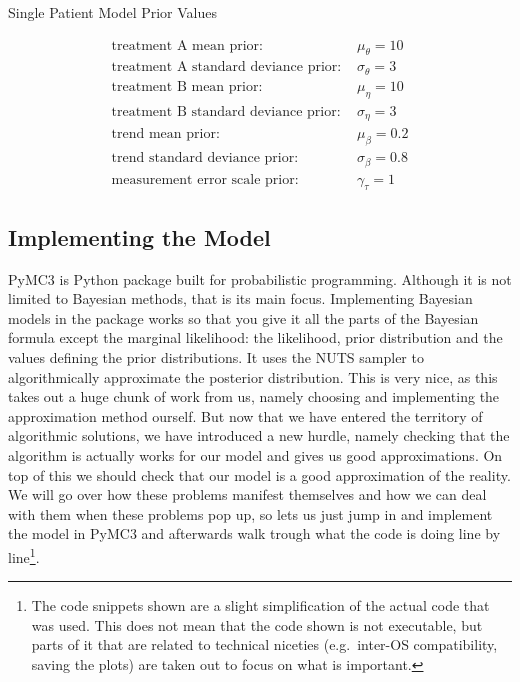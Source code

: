 \documentclass[12pt,a4paper,leqno]{report}
\theoremstyle{plain}
\theoremstyle{definition}
\theoremstyle{remark}
\begin{document}
\begin{table}[H]
    \caption{Single Patient Model Prior Values}\label{singlelpatientmodelpriorvalues}
    \begin{align}\label{}
        \text{treatment A mean prior: } & \mu_{\theta} = 10 \nonumber \\
        \text{treatment A standard deviance prior: } & \sigma_{\theta} = 3 \nonumber \\
        \text{treatment B mean prior: } & \mu_{\eta} = 10 \nonumber \\
        \text{treatment B standard deviance prior: } & \sigma_{\eta} = 3 \nonumber \\
        \text{trend mean prior: } & \mu_{\beta} = 0.2 \nonumber \\
        \text{trend standard deviance prior: } & \sigma_{\beta} = 0.8 \nonumber \\
        \text{measurement error scale prior: } & \gamma_{\tau} = 1 \nonumber
    \end{align}
\end{table}

\subsection{Implementing the Model}

PyMC3 is Python package built for probabilistic programming. Although it is not
limited to Bayesian methods, that is its main focus. Implementing Bayesian models in
the package works so that you give it all the parts of the Bayesian formula except the
marginal likelihood: the likelihood, prior
distribution and the values defining the prior distributions. It uses the NUTS
sampler\cite{nuts} to algorithmically approximate the posterior distribution. This is
very nice, as this takes out a huge chunk of work from us, namely choosing and
implementing the approximation method
ourself. But now that we have entered the territory of algorithmic solutions, we have
introduced a new hurdle, namely checking that the algorithm is actually works for our
model and gives us good approximations. On top of this we should check that our model is a good
approximation of the reality. We will go over how these problems manifest themselves and
how we can deal with them when these problems pop up, so lets us just jump in and
implement the model in PyMC3 and afterwards walk trough what the code is
doing line by line\footnote{The code snippets shown are a
slight simplification of the actual code that was used. This does not mean
that the code shown is not executable, but parts of it that are related to technical niceties
(e.g.\ inter-OS compatibility, saving the plots) are taken out to focus on what is
important.}.
\end{document}
